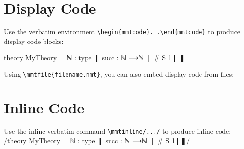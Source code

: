 \documentclass{article}
\begin{document}
	\section{Display Code}
	Use the verbatim environment \verb|\begin{mmtcode}...\end{mmtcode}| to produce display code blocks:
	\begin{mmtcode}
theory MyTheory =
	ℕ : type ❙
	succ : ℕ ⟶ℕ ❘ # S 1❙
❚
	\end{mmtcode}

	Using \verb|\mmtfile{filename.mmt}|, you can also embed display code from files:

	\section{Inline Code}
	Use the inline verbatim command \verb|\mmtinline/.../| to produce inline code: \mmtinline/theory MyTheory = ℕ : type ❙ succ : ℕ ⟶ℕ ❘ # S 1❙❚/
\end{document}

